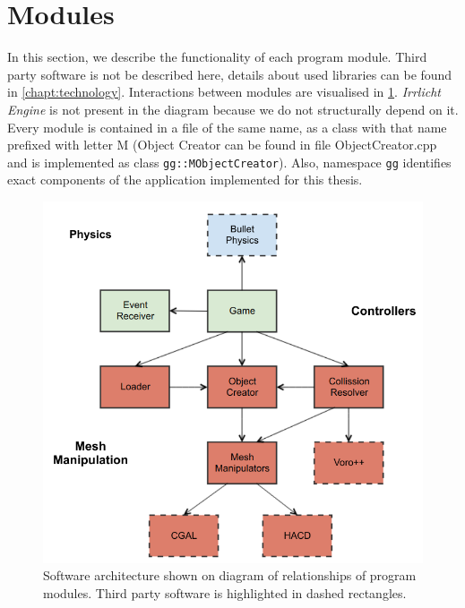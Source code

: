 \section{Modules}
In this section, we describe the functionality of each program module. Third party software is not be described here, details about used libraries can be found in \cref{chapt:technology}. Interactions between modules are visualised in \cref{fig:modules}. \emph{Irrlicht Engine} is not present in the diagram because we do not structurally depend on it. Every module is contained in a file of the same name, as a class with that name prefixed with letter M (\ie Object Creator can be found in file ObjectCreator.cpp and is implemented as class {\tt gg::MObjectCreator}). Also, namespace {\tt gg} identifies exact components of the application implemented for this thesis.

\begin{figure}
        \centering
        \includegraphics[width=\textwidth]{img/objectmodel}
        \caption{Software architecture shown on diagram of relationships of program modules. Third party software is highlighted in dashed rectangles.}
        \label{fig:modules}
\end{figure}

